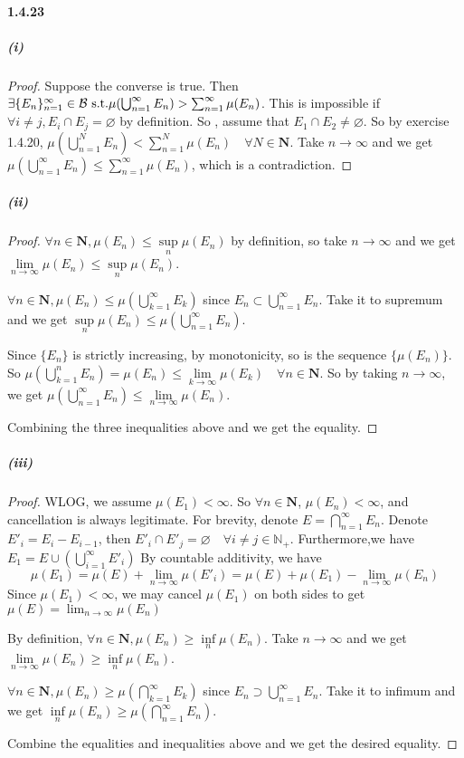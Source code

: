 \documentclass{article}
\begin{document}
\paragraph{1.4.23}
\subparagraph{(i)}
\begin{proof}
Suppose the converse is true. Then $\exists \{E_n\}_{n=1}^{\infty}\in \mathcal{B}\text{ s.t.} \mu(\bigcup_{n=1}^{\infty}E_n)>\sum_{n=1}^{\infty}\mu(E_n)$. This is impossible if $\forall i\neq j, E_i\cap E_j=\varnothing$ by definition. So \WLOG , assume that $E_1\cap E_2\neq \varnothing$. So by exercise 1.4.20, $\mu(\bigcup_{n=1}^N E_n)<\sum_{n=1}^{N}\mu(E_n)\quad \forall N\in \mathbf{N}$. Take $n\to\infty$ and we get $\mu(\bigcup_{n=1}^{\infty}E_n)\leq \sum_{n=1}^{\infty}\mu(E_n)$, which is a contradiction.
\end{proof}
\subparagraph{(ii)}
\begin{proof}
$\forall n\in \mathbf{N}, \mu(E_n)\leq \sup\limits_{n}\mu(E_n)$ by definition, so take $n\to\infty$ and we get $\lim\limits_{n\to\infty}\mu(E_n)\leq \sup\limits_{n}\mu(E_n)$.

$\forall n\in\mathbf{N},\mu(E_n)\leq \mu(\bigcup\limits_{k=1}^{\infty}E_k)$ since $E_n\subset \bigcup\limits_{n=1}^{\infty}E_n$. Take it to supremum and we get $\sup\limits_{n}\mu(E_n)\leq \mu(\bigcup\limits_{n=1}^{\infty}E_n)$.

Since $\{E_n\}$ is strictly increasing, by monotonicity, so is the sequence $\{\mu(E_n)\}$. So $\mu(\bigcup_{k=1}^n E_n)=\mu(E_n)\leq \lim\limits_{k\to\infty} \mu(E_k)\quad \forall n\in\mathbf{N}$. So by taking $n\to\infty$, we get $\mu(\bigcup\limits_{n=1}^{\infty}E_n)\leq \lim\limits_{n\to\infty}\mu(E_n)$.

Combining the three inequalities above and we get the equality.
\end{proof}
\subparagraph{(iii)}
\begin{proof}
WLOG, we assume $\mu(E_1)<\infty$. So $\forall n\in \mathbf{N}$, $\mu(E_n)<\infty$, and cancellation is always legitimate. For brevity, denote $E=\bigcap\limits_{n=1}^{\infty}E_n$.  Denote $E'_i=E_i-E_{i-1}$, then $E'_i\cap E'_j=\varnothing \quad \forall i\neq j\in\mathbb{N}_+$. Furthermore,we have $E_1=E\cup(\bigcup_{i=1}^{\infty}E'_i)$
By countable additivity, we have
\[\mu(E_1)=\mu(E)+\lim_{n\to\infty}\mu(E'_i)=\mu(E)+\mu(E_1)-\lim_{n\to\infty}\mu(E_n)\]
Since $\mu(E_1)<\infty$, we may cancel $\mu(E_1)$ on both sides to get $\mu(E)=\lim_{n\to\infty}\mu(E_n)$

By definition, $\forall n\in\mathbf{N}, \mu(E_n)\geq \inf\limits_{n}\mu (E_n)$. Take $n\to\infty$ and we get $\lim\limits_{n\to\infty}\mu(E_n)\geq \inf\limits_{n}\mu(E_n)$.

$\forall n\in\mathbf{N},\mu(E_n)\geq \mu(\bigcap\limits_{k=1}^{\infty}E_k)$ since $E_n\supset \bigcup\limits_{n=1}^{\infty}E_n$. Take it to infimum and we get $\inf\limits_{n}\mu(E_n)\geq \mu(\bigcap\limits_{n=1}^{\infty}E_n)$.

Combine the equalities and inequalities above and we get the desired equality.
\end{proof}
\end{document}

